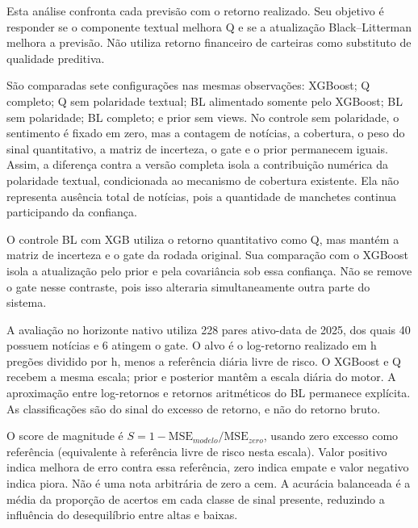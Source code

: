 Esta análise confronta cada previsão com o retorno realizado. Seu objetivo é responder se o componente textual melhora Q e se a atualização Black--Litterman melhora a previsão. Não utiliza retorno financeiro de carteiras como substituto de qualidade preditiva.

São comparadas sete configurações nas mesmas observações: XGBoost; Q completo; Q sem polaridade textual; BL alimentado somente pelo XGBoost; BL sem polaridade; BL completo; e prior sem views. No controle sem polaridade, o sentimento é fixado em zero, mas a contagem de notícias, a cobertura, o peso do sinal quantitativo, a matriz de incerteza, o gate e o prior permanecem iguais. Assim, a diferença contra a versão completa isola a contribuição numérica da polaridade textual, condicionada ao mecanismo de cobertura existente. Ela não representa ausência total de notícias, pois a quantidade de manchetes continua participando da confiança.

O controle BL com XGB utiliza o retorno quantitativo como Q, mas mantém a matriz de incerteza e o gate da rodada original. Sua comparação com o XGBoost isola a atualização pelo prior e pela covariância sob essa confiança. Não se remove o gate nesse contraste, pois isso alteraria simultaneamente outra parte do sistema.

A avaliação no horizonte nativo utiliza 228 pares ativo-data de 2025, dos quais 40 possuem notícias e 6 atingem o gate. O alvo é o log-retorno realizado em h pregões dividido por h, menos a referência diária livre de risco. O XGBoost e Q recebem a mesma escala; prior e posterior mantêm a escala diária do motor. A aproximação entre log-retornos e retornos aritméticos do BL permanece explícita. As classificações são do sinal do excesso de retorno, e não do retorno bruto.

O score de magnitude é $S=1-\mathrm{MSE}_{modelo}/\mathrm{MSE}_{zero}$, usando zero excesso como referência (equivalente à referência livre de risco nesta escala). Valor positivo indica melhora de erro contra essa referência, zero indica empate e valor negativo indica piora. Não é uma nota arbitrária de zero a cem. A acurácia balanceada é a média da proporção de acertos em cada classe de sinal presente, reduzindo a influência do desequilíbrio entre altas e baixas.

